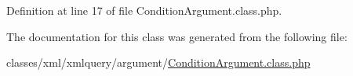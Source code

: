 Definition at line 17 of file Condition\-Argument.\-class.\-php.



The documentation for this class was generated from the following file\-:\begin{DoxyCompactItemize}
\item 
classes/xml/xmlquery/argument/\hyperlink{ConditionArgument_8class_8php}{Condition\-Argument.\-class.\-php}\end{DoxyCompactItemize}
